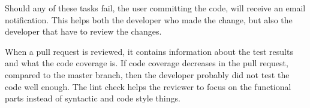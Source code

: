 Should any of these tasks fail, the user committing the code, will receive an email notification.
This helps both the developer who made the change, but also the developer that have to review the changes.

When a pull request is reviewed, it contains information about the test results and what the code coverage is.
If code coverage decreases in the pull request, compared to the master branch, then the developer probably did not test the code well enough. 
The lint check helps the reviewer to focus on the functional parts instead of syntactic and code style things.
